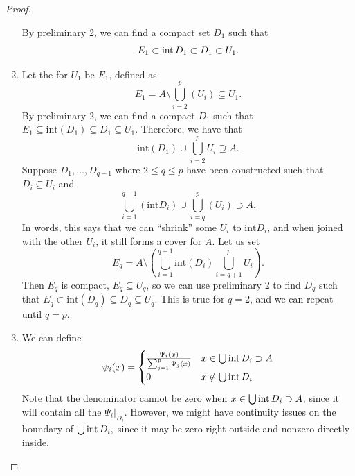 \documentclass{article}
\numberwithin{equation}{section}
\begin{document}
\begin{proof}
\begin{enumerate}
        By preliminary 2, we can find a compact set $D_1$ such that 
        \begin{equation}
            E_1 \subset \operatorname{int} D_1 \subset D_1 \subset U_1.
        \end{equation}
        \item Let the  for $U_1$ be $E_1$, defined as
        \begin{equation}
            E_1 = A \setminus \bigcup_{i=2}^{p}(U_i) \subseteq U_1.
        \end{equation}
        By preliminary 2, we can find a compact $D_1$ such that $E_1 \subseteq \text{int}(D_1) \subseteq D_1 \subseteq U_1$. Therefore, we have that
        \begin{equation}
            \text{int}(D_1) \cup \bigcup_{i=2}^pU_i \supseteq A.
        \end{equation}
        Suppose $D_1,\dots,D_{q-1}$ where $2\le q \le p$ have been constructed such that $D_i \subseteq U_i$ and \begin{equation}
            \bigcup_{i=1}^{q-1}(\text{int} D_i) \cup \bigcup_{i=q}^p(U_i) \supset A.
        \end{equation}
        In words, this says that we can ``shrink'' some $U_i$ to $\text{int} D_i$, and when joined with the other $U_i$, it still forms a cover for $A$. Let us set 
        \begin{equation}
            E_q = A \setminus \left(\bigcup_{i=1}^{q-1}\text{int}(D_i) \bigcup_{i=q+1}^p U_i\right).
        \end{equation}
        Then $E_q$ is compact, $E_q \subseteq U_q$, so we can use preliminary 2 to find $D_q$ such that $E_q \subset \text{int}(D_q) \subseteq D_q \subseteq U_q$. This is true for $q=2$, and we can repeat until $q=p$.
        \item We can define 
        \begin{equation}
            \psi_i(x) = \begin{cases}
                \frac{\Psi_i(x)}{\sum_{j=1}^{p} \Psi_j(x)} & x \in \bigcup \operatorname{int} D_i \supset A \\ 
                0 & x \notin \bigcup \operatorname{int} D_i
            \end{cases}
        \end{equation}
        Note that the denominator cannot be zero when $x\in \bigcup \operatorname{int} D_i \supset A$, since it will contain all the $\Psi_i |_{D_i}$. However, we might have continuity issues on the boundary of $\bigcup \operatorname{int} D_i,$ since it may be zero right outside and nonzero directly inside.

\end{enumerate}
\end{proof}
\end{document}
